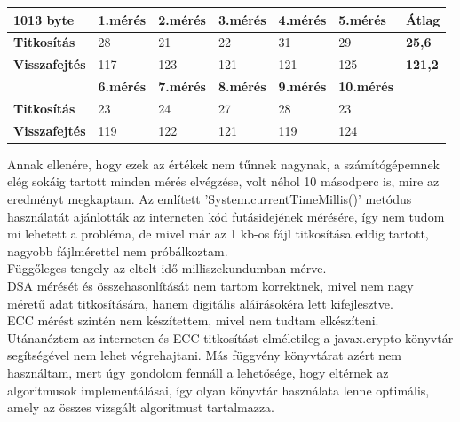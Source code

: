 \begin{center}
	
	
	\begin{tabular}{|p{2.4cm}|p{1.6cm}|p{1.6cm}|p{1.7cm}|p{1.7cm}|p{1.8cm}|p{1.5cm}|}
		\hline
		\textbf{1013 byte} & \textbf{1.mérés} & \textbf{2.mérés} & \textbf{3.mérés} & \textbf{4.mérés} & \textbf{5.mérés} & \textbf{Átlag} \\
		\hline
		\textbf{Titkosítás}&28&21&22&31&29& \textbf{25,6} \\
		\hline
		\textbf{Visszafejtés}&117&123&121&121&125& \textbf{121,2} \\
		\hline
		& \textbf{6.mérés} & \textbf{7.mérés} & \textbf{8.mérés} & \textbf{9.mérés} & \textbf{10.mérés} & \\
		\hline
		\textbf{Titkosítás}&23&24&27&28&23&\\
		\hline
		\textbf{Visszafejtés}&119&122&121&119&124&\\
		\hline
	\end{tabular}
\end{center}

Annak ellenére, hogy ezek az értékek nem  tűnnek nagynak, a számítógépemnek elég sokáig tartott minden mérés elvégzése, volt néhol 10 másodperc is, mire az eredményt megkaptam. Az említett ’System.currentTimeMillis()’ metódus használatát ajánlották az interneten kód futásidejének mérésére, így nem tudom mi lehetett a probléma, de mivel már az 1 kb-os fájl titkosítása eddig tartott, nagyobb fájlmérettel nem próbálkoztam.
\vspace{5pt} \\Függőleges tengely az eltelt idő milliszekundumban mérve.
\vspace{15pt} \\DSA mérését és összehasonlítását nem tartom korrektnek, mivel nem nagy méretű adat titkosítására, hanem digitális aláírásokéra lett kifejlesztve.
\\ECC mérést szintén nem készítettem, mivel nem tudtam elkészíteni. Utánanéztem az interneten és ECC titkosítást elméletileg a javax.crypto könyvtár segítségével nem lehet végrehajtani. Más függvény könyvtárat azért nem használtam, mert úgy gondolom fennáll a lehetősége, hogy eltérnek az algoritmusok implementálásai, így olyan könyvtár használata lenne optimális, amely az összes vizsgált algoritmust tartalmazza.

